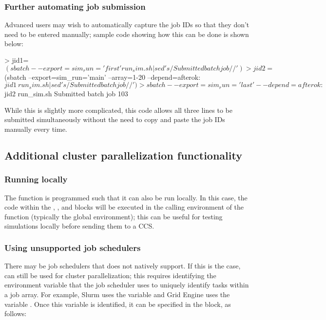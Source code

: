 \subsubsection{Further automating job submission}

Advanced users may wish to automatically capture the job IDs so that they don't need to be entered manually; sample code showing how this can be done is shown below:

\begin{example}
> jid1=$(sbatch --export=sim_run='first' run_sim.sh | sed 's/Submitted batch job //')
> jid2=$(sbatch --export=sim_run='main' --array=1-20 --depend=afterok:$jid1 \
    run_sim.sh | sed 's/Submitted batch job //')
> sbatch --export=sim_run='last' --depend=afterok:$jid2 run_sim.sh
Submitted batch job 103
\end{example}

While this is slightly more complicated, this code allows all three lines to be submitted simultaneously without the need to copy and paste the job IDs manually every time.

\subsection{Additional cluster parallelization functionality}

\subsubsection{Running locally}

The  function is programmed such that it can also be run locally. In this case, the code within the , , and  blocks will be executed in the calling environment of the  function (typically the global environment); this can be useful for testing simulations locally before sending them to a CCS.

\subsubsection{Using unsupported job schedulers}

There may be job schedulers that  does not natively support. If this is the case,  can still be used for cluster parallelization; this requires identifying the environment variable that the job scheduler uses to uniquely identify tasks within a job array. For example, Slurm uses the variable  and Grid Engine uses the variable . Once this variable is identified, it can be specified in the  block, as follows:

